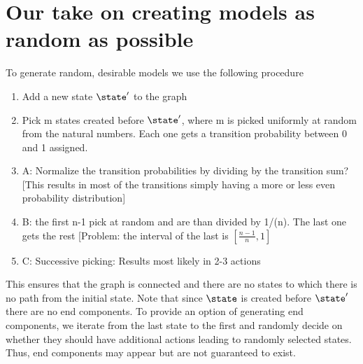 \section{Our take on creating models as random as possible}
To generate random, desirable models we use the following procedure \label{procedure:randomRandom}
\begin{enumerate}
 \item Add a new state $\state'$ to the graph
 \item Pick m states created before $\state'$, where m is picked uniformly at random from the natural numbers. Each one gets a transition probability between 0 and 1 assigned.
 \item A: Normalize the transition probabilities by dividing by the transition sum? [This results in most of the transitions simply having a more or less even probability distribution]
 \item B: the first n-1 pick at random and are than divided by 1/(n). The last one gets the rest [Problem: the interval of the last is $[\frac{n-1}{n}, 1]$
 \item C: Successive picking: Results most likely in 2-3 actions
 
\end{enumerate}
This ensures that the graph is connected and there are no states to which there is no path from the initial state. Note that since $\state$ is created before $\state'$ there are no end components. To provide an option of generating end components, we iterate from the last state to the first and randomly decide on whether they should have additional actions leading to randomly selected states. Thus, end components may appear but are not guaranteed to exist.

